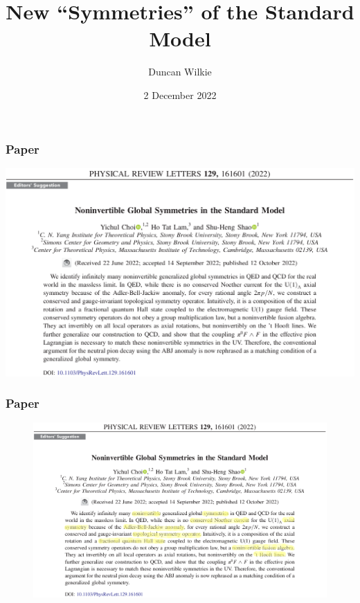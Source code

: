 \documentclass[10pt]{beamer}
\title{New ``Symmetries'' of the Standard Model}
\author{Duncan Wilkie}
\date{2 December 2022}
\begin{document}
\begin{frame}
  \titlepage
\end{frame}

\begin{frame}
  \frametitle{Paper}
  \begin{center}
    \includegraphics[scale=0.28]{abstract.png}
  \end{center}
\end{frame}

\begin{frame}
  \frametitle{Paper}
  \begin{figure}
    \centering
    \includegraphics[scale=0.28]{abstract_interesting.png}
  \end{figure}
\end{frame}
\end{document}
